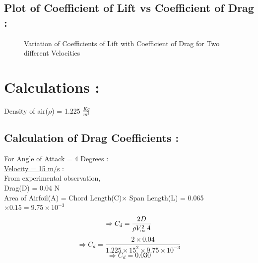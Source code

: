 \documentclass[12pt,a4paper]{article}
\begin{document}
\newpage









\newpage

\subsection{Plot of Coefficient of Lift vs Coefficient of Drag : } 



\begin{figure}[!ht]
	\begin{center}
	\end{center}
	\caption{Variation of Coefficients of Lift with Coefficient of Drag for Two different Velocities}
\end{figure}

\newpage


\section{Calculations :}
Density of air($\rho$) = 1.225 $\frac{Kg}{m^3}$ \\


\subsection{Calculation of Drag Coefficients :}
For Angle of Attack = 4 Degrees : \\
\underline{Velocity = 15 m/s} :\\
From experimental observation, \\
Drag(D) = 0.04 N\\
Area of Airfoil(A) = Chord Length(C)$\times$ Span Length(L) = 0.065$\times0.15 = 9.75 \times 10^{-3}$  \\
$$\Rightarrow C_d = \frac{2D}{\rho V_{\infty}^2 A}\\$$
$$\Rightarrow C_d = \frac{2\times 0.04}{1.225 \times 15^2 \times 9.75 \times 10^{-3}} $$
$$\Rightarrow \boxed{C_d = 0.030} $$
\end{document}
